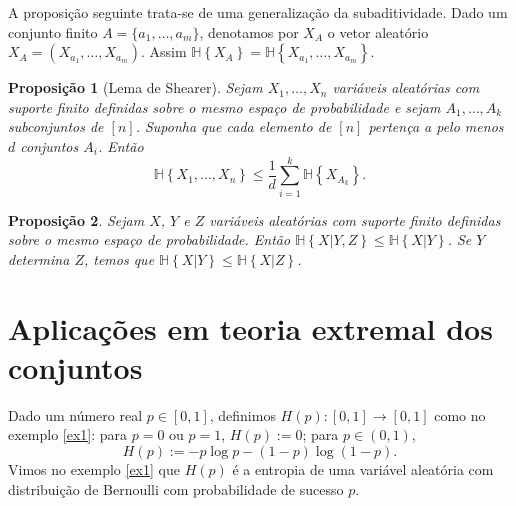 \documentclass{amsart}
\theoremstyle{theorem}
\newtheorem{proposicao}{Proposi\c{c}\~{a}o}[section]
\theoremstyle{definition}
\theoremstyle{remark}
\numberwithin{equation}{section}
\newcommand{\HH}[1]{\mathbb{H}\left\{ #1 \right\}}
\begin{document}
A proposi\c{c}\~{a}o seguinte trata-se de uma generaliza\c{c}\~{a}o da subaditividade. Dado um conjunto finito $A = \{a_1,\ldots,a_m\}$, denotamos por $X_A$ o vetor aleat\'{o}rio $X_{A} = (X_{a_1},\ldots, X_{a_m})$. Assim $\HH{X_A} = \HH{X_{a_1},\ldots, X_{a_m}}$.

\begin{proposicao}[Lema de Shearer]
  Sejam $X_1,\ldots,X_n$ vari\'{a}veis aleat\'{o}rias com suporte finito definidas sobre o mesmo espa\c{c}o de probabilidade e sejam $A_1,\ldots,A_k$ subconjuntos de $[n]$. Suponha que cada elemento de $[n]$ perten\c{c}a a pelo menos $d$ conjuntos $A_i$. Ent\~{a}o
  \begin{equation}
    \HH{X_1,\ldots,X_n} \leq \frac{1}{d} \sum_{i=1}^{k} \HH{X_{A_k}}.
  \end{equation}
\end{proposicao}


\begin{proposicao}
  Sejam $X$, $Y$ e $Z$ vari\'{a}veis aleat\'{o}rias com suporte finito definidas sobre o mesmo espa\c{c}o de probabilidade. Ent\~{a}o $\HH{X|Y,Z} \leq \HH{X|Y}$. Se $Y$ determina $Z$, temos que $\HH{X|Y} \leq \HH{X|Z}$.
\end{proposicao}

\section{Aplica\c{c}\~{o}es em teoria extremal dos conjuntos}
Dado um n\'{u}mero real $p\in[0,1]$, definimos $H(p):[0,1]\rightarrow [0,1]$ como no exemplo \ref{ex1}: para $p = 0$ ou $p=1$, $H(p) := 0$; para $p\in(0,1)$,
\begin{equation}
  H(p) := -p\log{p} - (1-p)\log(1-p).
\end{equation}
Vimos no exemplo \ref{ex1} que $H(p)$ \'{e} a entropia de uma vari\'{a}vel aleat\'{o}ria com distribui\c{c}\~{a}o de Bernoulli com probabilidade de sucesso $p$.
\end{document}
